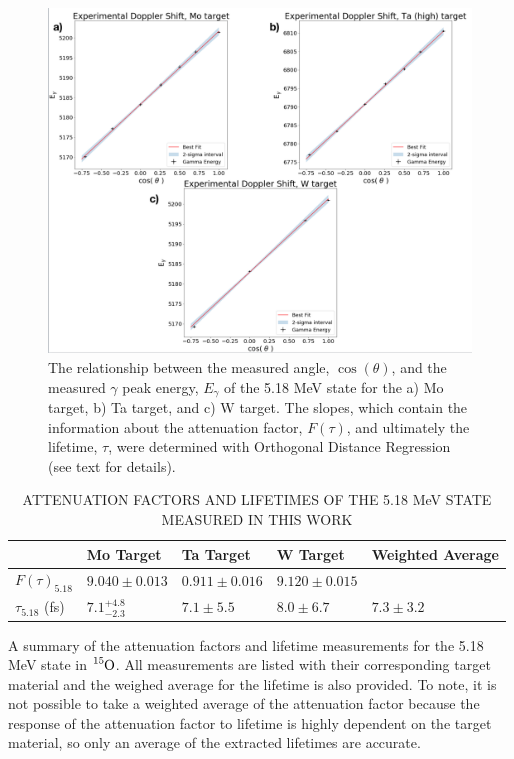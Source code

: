 \begin{figure}
\centering
\includegraphics[width=\linewidth]{figures/doppler518.png}
\caption{The relationship between the measured angle, $\cos(\theta)$, and the measured $\gamma$ peak energy, $E_{\gamma}$ of the 5.18 MeV state for the a) Mo target, b) Ta target, and c) W target. The slopes, which contain the information about the attenuation factor, $F(\tau)$, and ultimately the lifetime, $\tau$, were determined with Orthogonal Distance Regression (see text for details). }
\label{fig: doppler518}
\end{figure}


\begin{table}[]
\caption{ATTENUATION FACTORS AND LIFETIMES OF THE 5.18 MeV STATE MEASURED IN THIS WORK}
\centering
\begin{threeparttable}
\begin{tabular}{@{}lllll@{}}
\toprule
                   & Mo Target  & Ta Target & W Target & Weighted Average \\ \midrule
$F(\tau)_{5.18}$   & $9.040 \pm 0.013$     & $0.911 \pm 0.016$   & $9.120 \pm 0.015$   &                  \\
$\tau_{5.18}$ (fs) & $﻿7.1^{+4.8}_{-2.3}$ & $7.1 \pm 5.5$       & $8.0 \pm 6.7$      & $7.3 \pm 3.2$    \\ \bottomrule
\end{tabular}
\begin{tablenotes}
\small 
\item A summary of the attenuation factors and lifetime measurements for the 5.18 MeV state in $\ce{^{15}O}$. All measurements are listed with their corresponding target material and the weighed average for the lifetime is also provided. To note, it is not possible to take a weighted average of the attenuation factor because the response of the attenuation factor to lifetime is highly dependent on the target material, so only an average of the extracted lifetimes are accurate.
\end{tablenotes}
\end{threeparttable}
\label{table: afTau518}
\end{table}

